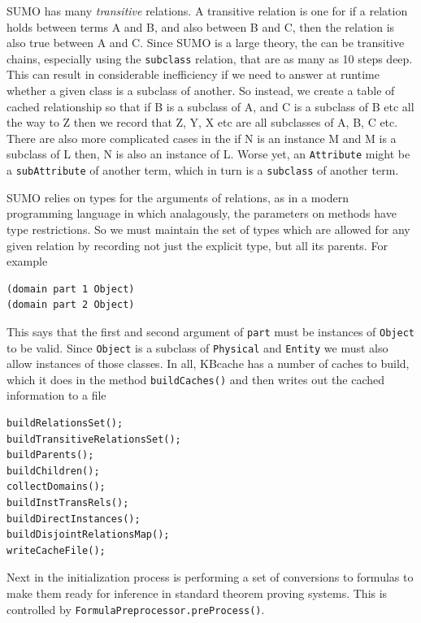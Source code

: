 \documentclass{book}
\begin{document}
SUMO has many
\textit{transitive} relations.  A transitive relation is one for if a relation holds
between terms A and B, and also between B and C, then the relation is also true between
A and C.  Since SUMO is a large theory, the can be transitive chains, especially using the
\texttt{subclass} relation, that are as many as 10 steps deep.  This can result in
considerable inefficiency if we need to answer at runtime whether a given class is a subclass
of another.  So instead, we create a table of cached relationship so that if B is a subclass of
A, and C is a subclass of B etc all the way to Z then we record that Z, Y, X etc are all subclasses
of A, B, C etc.  There are also more complicated cases in the if N is an instance M and M is
a subclass of L then, N is also an instance of L.  Worse yet, an \texttt{Attribute} might be a 
\texttt{subAttribute} of another term, which in turn is a \texttt{subclass} of another term.

SUMO relies on types for the arguments of relations, as in a modern programming language in which
analagously, the parameters on methods have type restrictions.  So we must maintain the set of
types which are allowed for any given relation by recording not just the explicit type, but all
its parents.  For example

\begin{lstlisting}[basicstyle=\ttfamily\small\bfseries]
(domain part 1 Object)	
(domain part 2 Object)
\end{lstlisting}

This says that the first and second argument of \texttt{part} must be instances of \texttt{Object}
to be valid.  Since \texttt{Object} is a subclass of \texttt{Physical} and \texttt{Entity} we must
also allow instances of those classes.  In all, KBcache has a number of caches to build, which it
does in the method \texttt{buildCaches()} and then writes out the cached information to a file

\begin{lstlisting}[basicstyle=\ttfamily\small\bfseries]
buildRelationsSet();
buildTransitiveRelationsSet();
buildParents();
buildChildren(); 
collectDomains();
buildInstTransRels();
buildDirectInstances();
buildDisjointRelationsMap(); 
writeCacheFile();
\end{lstlisting}

Next in the initialization process is performing a set of conversions to formulas to
make them ready for inference in standard theorem proving systems.  This is controlled
by \texttt{FormulaPreprocessor.preProcess()}.
\end{document}
